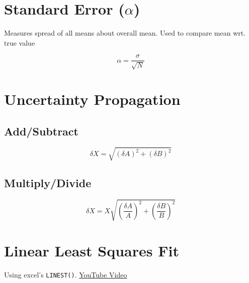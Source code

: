 \documentclass[12pt]{article}
\newcommand{\hilight}[1]{\colorbox{Dandelion}{#1}}
\begin{document}
\section{Standard Error ($\alpha$)}

Measures \hilight{spread of all means about overall mean}. Used to compare \hilight{mean} wrt. \hilight{true value}

\vspace{0.5cm}

\begin{mdframed}
$$\alpha = \frac{\sigma}{\sqrt{N}}$$
\end{mdframed}

\section{Uncertainty Propagation}

\subsection{Add/Subtract}

\begin{mdframed}
	$$\delta X = \sqrt{(\delta A)^2 + (\delta B)^2}$$
\end{mdframed}

\subsection{Multiply/Divide}

\begin{mdframed}
	$$\delta X = X \sqrt{(\frac{\delta A}{A})^2 + (\frac{\delta B}{B})^2}$$
\end{mdframed}

\section{Linear Least Squares Fit}

Using excel's \texttt{LINEST()}. \href{http://www.youtube.com/watch?v=ECA2VSOhbuU}{YouTube Video}
\end{document}
